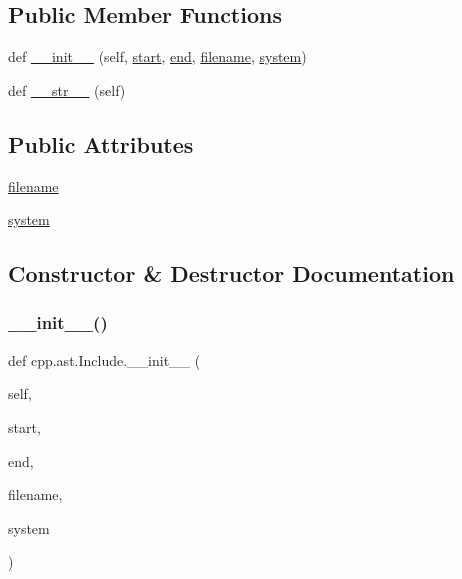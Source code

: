 \subsection*{Public Member Functions}
\begin{DoxyCompactItemize}
\item 
def \hyperlink{classcpp_1_1ast_1_1_include_a41b000a9f16a9a1840e56a761bb7045c}{\+\_\+\+\_\+init\+\_\+\+\_\+} (self, \hyperlink{classcpp_1_1ast_1_1_node_a7b2aa97e6a049bb1a93aea48c48f1f44}{start}, \hyperlink{classcpp_1_1ast_1_1_node_a3c5e5246ccf619df28eca02e29d69647}{end}, \hyperlink{classcpp_1_1ast_1_1_include_a9ecff64f127655d3c17e9abe4ebe3852}{filename}, \hyperlink{classcpp_1_1ast_1_1_include_a2e8e535b1af7d9b0ff94d0ae9f86e5c5}{system})
\item 
def \hyperlink{classcpp_1_1ast_1_1_include_ad7d9e5e8f46dcb1a91a282e609412a3e}{\+\_\+\+\_\+str\+\_\+\+\_\+} (self)
\end{DoxyCompactItemize}
\subsection*{Public Attributes}
\begin{DoxyCompactItemize}
\item 
\hyperlink{classcpp_1_1ast_1_1_include_a9ecff64f127655d3c17e9abe4ebe3852}{filename}
\item 
\hyperlink{classcpp_1_1ast_1_1_include_a2e8e535b1af7d9b0ff94d0ae9f86e5c5}{system}
\end{DoxyCompactItemize}


\subsection{Constructor \& Destructor Documentation}
\mbox{\label{classcpp_1_1ast_1_1_include_a41b000a9f16a9a1840e56a761bb7045c}} 
\subsubsection{\texorpdfstring{\+\_\+\+\_\+init\+\_\+\+\_\+()}{\_\_init\_\_()}}
{\footnotesize\ttfamily def cpp.\+ast.\+Include.\+\_\+\+\_\+init\+\_\+\+\_\+ (\begin{DoxyParamCaption}\item[{}]{self,  }\item[{}]{start,  }\item[{}]{end,  }\item[{}]{filename,  }\item[{}]{system }\end{DoxyParamCaption})}



